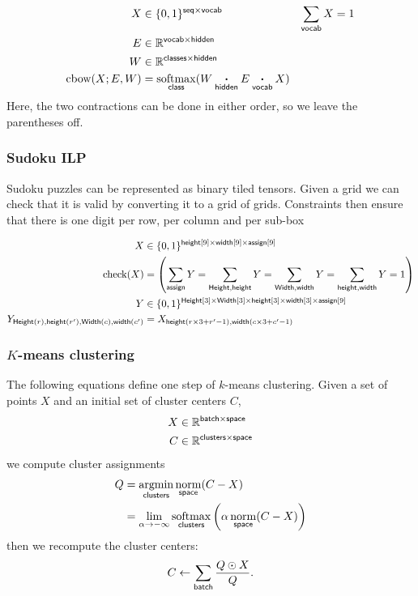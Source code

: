 \documentclass{article}
\newcommand{\reals}{\mathbb{R}}
\begin{document}
\begin{align*}
X &\in \{0, 1\}^{{\name{seq} \times \name{vocab}}} & \nsum{vocab} X &= 1\\
E &\in \reals^{{\name{vocab} \times \name{hidden}}}\\
W &\in \reals^{{\name{classes} \times \name{hidden}}}\\
\text{cbow}(X; E, W) &= \nfun{class}{softmax} (W \ndot{hidden} E \ndot{vocab} X)
\end{align*}
Here, the two contractions can be done in either order, so we leave the parentheses off.

\subsubsection{Sudoku ILP}

Sudoku puzzles can be represented as  binary tiled tensors.
Given a grid we can check that it is valid by converting it to a grid of grids. 
Constraints then ensure that there is one digit per row, per column and per sub-box

\begin{align*} 
X &\in \{0, 1\}^{\nset{height}{9} \times \nset{width}{9} \times \nset{assign}{9}}  \\
\text{check}(X) &=
\left(\nsum{assign} Y = 
\nsum{Height, height} Y = 
\nsum{Width, width} Y =  
\nsum{height, width} Y = 1 \right) \\
Y &\in \{0, 1\}^{\nset{Height}{3} \times \nset{Width}{3} \times \nset{height}{3} \times \nset{width}{3} \times \nset{assign}{9}}  \\
Y_{\nidx{Height}{r}, \nidx{height}{r'}, \nidx{Width}{c}, \nidx{width}{c'}} &= X_{\nidx{height}{r\times 3 + r'-1}, \nidx{width}{c\times3 + c'-1}}
\end{align*} 

\subsubsection{$K$-means clustering}

The following equations define one step of $k$-means clustering. Given a set of points $X$ and an initial set of cluster centers $C$,
\begin{align*}
  X &\in \reals^{\name{batch} \times \name{space}} \\
C &\in \reals^{\name{clusters} \times \name{space}}
\end{align*}
we compute cluster assignments
\begin{align*}
Q &= \nfun{clusters}{argmin} \nfun{space}{norm}(C-X) \\
  &= \lim_{\alpha \rightarrow -\infty} \nfun{clusters}{softmax} \left(\alpha \nfun{space}{norm}(C-X)\right)
\end{align*}
then we recompute the cluster centers:
\begin{equation*}
C \leftarrow \nsum{batch} \frac{Q \odot X}{Q}.
\end{equation*}
\end{document}
